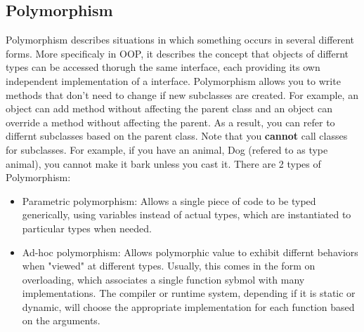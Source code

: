 \documentclass[a4paper, 11pt]{article}
\begin{document}
    \subsection{Polymorphism}
        Polymorphism describes situations in which something occurs in several different forms.  More specificaly in OOP, it describes the concept that objects of differnt types can be accessed thorugh the same interface, each providing its own independent implementation of a interface.
        \newline\newline
        Polymorphism allows you to write methods that don't need to change if new subclasses are created.
        For example, an object can add method without affecting the parent class and an object can override a method without affecting the parent.  As a result, you can refer to differnt subclasses based on the parent class.
        \newline\newline
        Note that you \textbf{cannot} call classes for subclasses.  For example, if you have an animal, Dog (refered to as type animal), you cannot make it bark unless you cast it.
        \newline\newline
        There are 2 types of Polymorphism:
        \begin{itemize}
            \item Parametric polymorphism: Allows a single piece of code to be typed generically, using variables instead of actual types, which are instantiated to particular types when needed.
            \item Ad-hoc polymorphism: Allows polymorphic value to exhibit differnt behaviors when "viewed" at different types.  Usually, this comes in the form on overloading, which associates a single function sybmol with many implementations.  The compiler or runtime system, depending if it is static or dynamic, will choose the appropriate implementation for each function based on the arguments.
        \end{itemize}
\end{document}
